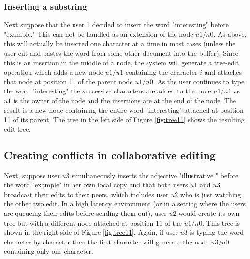 \documentclass{amsart}
\begin{document}
\subsubsection{Inserting a substring}
Next suppose that the user 1 decided to insert the word "interesting"
before "example."  This can not be handled as an extension of the node
$u1/n0$.  As above, this will actually be inserted one character at a time
in most cases (unless the user cut and pastes the word from some other
document into the buffer). Since this is an insertion in the middle of a node,
the system will generate a tree-edit operation which adds a new node $u1/n1$
containing the character $i$ and attaches that node at position 11 of the
parent node $u1/n0$.  As the user continues to type the word "interesting"
the successive characters are added to the node $u1/n1$ as $u1$ is the owner
of the node and the insertions are at the end of the node. The result
is a new node containing the entire word "interesting" attached at position
11 of its parent. The tree in the left side of Figure \ref{fig:tree11}
shows the resulting edit-tree.



\subsection{Creating conflicts in collaborative editing}
Next, suppose user $u3$ 
simultaneously inserts the adjective "illustrative "
before the word "example" in her own
local copy and that both users $u1$ and $u3$ broadcast their edits to their peers, which
includes user $u2$ who is just watching the other two edit.  
In a high latency environment (or in a setting where the users are queueing 
their edits before sending them out), user $u2$ would create its own tree
but with a different node attached at position 11 of the $u1/n0$. This tree
is shown in the right side of Figure \ref{fig:tree11}. Again, if user $u3$
is typing the word character by character then the first character will generate
the node $u3/n0$ containing only one character.
\end{document}
